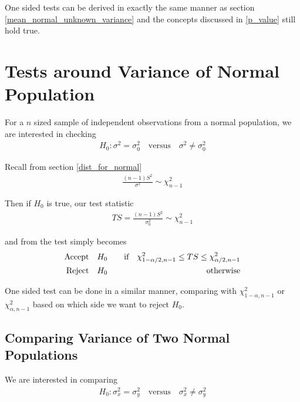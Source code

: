 \documentclass[../probability-notes.tex]{subfiles}
\begin{document}
    One sided tests can be derived in exactly the same manner as section \ref{mean_normal_unknown_variance} and the concepts discussed in \ref{p_value} still hold true.


    \section{Tests around Variance of Normal Population}
    For a $n$ sized sample of independent observations from a normal population, we are interested in checking
    \begin{align*}
        H_{0}: \sigma^{2} = \sigma_{0}^{2} \quad \text{versus} \quad \sigma^{2} \neq \sigma_{0}^{2}
    \end{align*}

    Recall from section \ref{dist_for_normal}
    \begin{align*}
        \frac{(n-1)S^{2}}{\sigma^{2}} \sim \chi_{n-1}^{2}
    \end{align*}

    Then if $H_{0}$ is true, our test statistic
    \begin{align*}
        TS = \frac{(n-1)S^{2}}{\sigma_{0}^{2}} \sim \chi_{n-1}^{2}
    \end{align*}

    and from the test simply becomes
    \begin{alignat*}{2}
        \text{Accept\quad} &H_{0} \quad &\text{if} \quad \chi_{1-\alpha/2, n-1}^{2} \leq TS \leq \chi_{\alpha/2, n-1}^{2}\\
        \text{Reject\quad} &H_{0} \quad &\text{otherwise}
    \end{alignat*}

    One sided test can be done in a similar manner, comparing with $\chi_{1-\alpha, n-1}^{2}$ or $\chi_{\alpha, n-1}^{2}$ based on which side we want to reject $H_{0}$.\newline

    \subsection{Comparing Variance of Two Normal Populations}
    We are interested in comparing
    \begin{align*}
        H_{0}: \sigma_{x}^{2} = \sigma_{y}^{2} \quad \text{versus} \quad \sigma_{x}^{2} \neq \sigma_{y}^{2}
    \end{align*}
\end{document}
